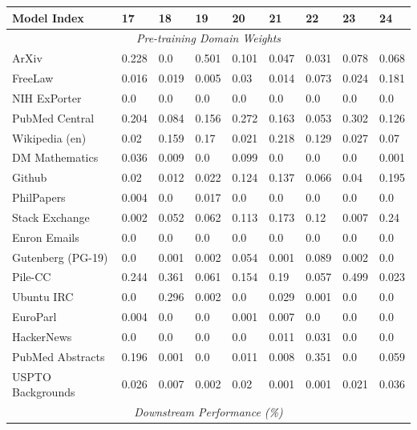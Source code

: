 \begin{table}[!ht]
    \centering
    \begin{tabular}{lllllllll}
    \toprule
        \textbf{Model Index} & \textbf{17} & \textbf{18} & \textbf{19} & \textbf{20} & \textbf{21} & \textbf{22} & \textbf{23} & \textbf{24} \\
        \midrule
        \multicolumn{9}{c}{\textit{Pre-training Domain Weights}} \\
        ArXiv & 0.228 & 0.0 & 0.501 & 0.101 & 0.047 & 0.031 & 0.078 & 0.068 \\ 
        FreeLaw & 0.016 & 0.019 & 0.005 & 0.03 & 0.014 & 0.073 & 0.024 & 0.181 \\ 
        NIH ExPorter & 0.0 & 0.0 & 0.0 & 0.0 & 0.0 & 0.0 & 0.0 & 0.0 \\ 
        PubMed Central & 0.204 & 0.084 & 0.156 & 0.272 & 0.163 & 0.053 & 0.302 & 0.126 \\ 
        Wikipedia (en) & 0.02 & 0.159 & 0.17 & 0.021 & 0.218 & 0.129 & 0.027 & 0.07 \\ 
        DM Mathematics & 0.036 & 0.009 & 0.0 & 0.099 & 0.0 & 0.0 & 0.0 & 0.001 \\ 
        Github & 0.02 & 0.012 & 0.022 & 0.124 & 0.137 & 0.066 & 0.04 & 0.195 \\ 
        PhilPapers & 0.004 & 0.0 & 0.017 & 0.0 & 0.0 & 0.0 & 0.0 & 0.0 \\ 
        Stack Exchange & 0.002 & 0.052 & 0.062 & 0.113 & 0.173 & 0.12 & 0.007 & 0.24 \\ 
        Enron Emails & 0.0 & 0.0 & 0.0 & 0.0 & 0.0 & 0.0 & 0.0 & 0.0 \\ 
        Gutenberg (PG-19) & 0.0 & 0.001 & 0.002 & 0.054 & 0.001 & 0.089 & 0.002 & 0.0 \\ 
        Pile-CC & 0.244 & 0.361 & 0.061 & 0.154 & 0.19 & 0.057 & 0.499 & 0.023 \\ 
        Ubuntu IRC & 0.0 & 0.296 & 0.002 & 0.0 & 0.029 & 0.001 & 0.0 & 0.0 \\ 
        EuroParl & 0.004 & 0.0 & 0.0 & 0.001 & 0.007 & 0.0 & 0.0 & 0.0 \\ 
        HackerNews & 0.0 & 0.0 & 0.0 & 0.0 & 0.011 & 0.031 & 0.0 & 0.0 \\ 
        PubMed Abstracts & 0.196 & 0.001 & 0.0 & 0.011 & 0.008 & 0.351 & 0.0 & 0.059 \\ 
        USPTO Backgrounds & 0.026 & 0.007 & 0.002 & 0.02 & 0.001 & 0.001 & 0.021 & 0.036 \\
        \midrule
        \multicolumn{9}{c}{\textit{Downstream Performance (\%)}} \\

\end{tabular}
\end{table}
